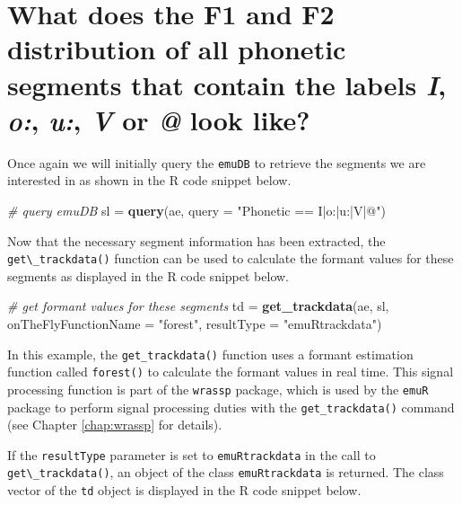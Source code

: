 \documentclass[]{book}
\newenvironment{Shaded}{\begin{snugshade}}{\end{snugshade}}
\newcommand{\CommentTok}[1]{\textcolor[rgb]{0.56,0.35,0.01}{\textit{#1}}}
\newcommand{\DataTypeTok}[1]{\textcolor[rgb]{0.13,0.29,0.53}{#1}}
\newcommand{\KeywordTok}[1]{\textcolor[rgb]{0.13,0.29,0.53}{\textbf{#1}}}
\newcommand{\NormalTok}[1]{#1}
\newcommand{\StringTok}[1]{\textcolor[rgb]{0.31,0.60,0.02}{#1}}
\begin{document}
\hypertarget{sec:app-chap-useCases-q2}{%
\section{\texorpdfstring{What does the F1 and F2 distribution of all phonetic segments that contain the labels \emph{I}, \emph{o:}, \emph{u:}, \emph{V} or \emph{@} look like?}{What does the F1 and F2 distribution of all phonetic segments that contain the labels I, o:, u:, V or @ look like?}}\label{sec:app-chap-useCases-q2}}

Once again we will initially query the \texttt{emuDB} to retrieve the segments we are interested in as shown in the R code snippet below.

\begin{Shaded}
\begin{Highlighting}[]
\CommentTok{# query emuDB}
\NormalTok{sl =}\StringTok{ }\KeywordTok{query}\NormalTok{(ae, }\DataTypeTok{query =} \StringTok{"Phonetic == I|o:|u:|V|@"}\NormalTok{)}
\end{Highlighting}
\end{Shaded}

Now that the necessary segment information has been extracted, the \texttt{get\textbackslash{}\_trackdata()} function can be used to calculate the formant values for these segments as displayed in the R code snippet below.

\begin{Shaded}
\begin{Highlighting}[]
\CommentTok{# get formant values for these segments}
\NormalTok{td =}\StringTok{ }\KeywordTok{get_trackdata}\NormalTok{(ae, sl,}
                   \DataTypeTok{onTheFlyFunctionName =} \StringTok{"forest"}\NormalTok{,}
                   \DataTypeTok{resultType =} \StringTok{"emuRtrackdata"}\NormalTok{)}
\end{Highlighting}
\end{Shaded}

In this example, the \texttt{get\_trackdata()} function uses a formant estimation function called \texttt{forest()} to calculate the formant values in real time. This signal processing function is part of the \texttt{wrassp} package, which is used by the \texttt{emuR} package to perform signal processing duties with the \texttt{get\_trackdata()} command (see Chapter \ref{chap:wrassp} for details).

If the \texttt{resultType} parameter is set to \texttt{emuRtrackdata} in the call to \texttt{get\textbackslash{}\_trackdata()}, an object of the class \texttt{emuRtrackdata} is returned. The class vector of the \texttt{td} object is displayed in the R code snippet below.
\end{document}
